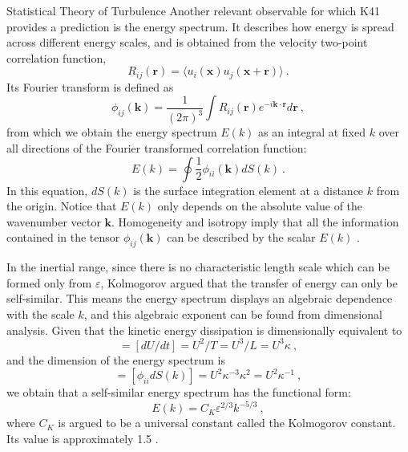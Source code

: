 \begin{chapter}{Statistical Theory of Turbulence}
Another relevant observable for which K41 provides a prediction
is the energy spectrum.
It describes how energy is spread across different energy scales,
and is obtained from the velocity two-point correlation function,
\begin{equation} \label{eq:vv-corr}
	R_{ij}(\mathbf{r}) = \langle u_i (\mathbf{x}) u_j(\mathbf{x}+\mathbf{r}) \rangle \ .
\end{equation}
Its Fourier transform is defined as
\begin{equation}
	\phi_{ij}(\mathbf{k}) = \frac{1}{(2 \pi)^3}
	\int R_{ij}(\mathbf{r}) e^{-i \mathbf{k} \cdot \mathbf{r}} d\mathbf{r} \ ,
\end{equation}
from which we obtain the energy spectrum $E(k)$ as an integral at fixed $k$
over all directions of the Fourier transformed correlation function:
\begin{equation}
	E(k) = \oint \frac12 \phi_{ii}(\mathbf{k}) dS(k) \ .
\end{equation}
In this equation, $dS(k)$ is the surface integration element at a distance $k$
from the origin.
Notice that $E(k)$ only depends on the absolute value of the wavenumber
vector $\mathbf{k}$. Homogeneity and isotropy imply that all the information
contained in the tensor $\phi_{ij}(\mathbf{k})$ can be described by the
scalar $E(k)$ \parencite{pope2000}.

In the inertial range, since there is no characteristic length scale which can
be formed only from $\varepsilon$, Kolmogorov argued that the transfer of energy can
only be self-similar. This means the energy spectrum displays an algebraic
dependence with the scale $k$,
and this algebraic exponent can be found from dimensional analysis.
Given that the kinetic energy dissipation is dimensionally equivalent to
\begin{equation}
	[ \varepsilon ] = [ dU/dt ] = U^2 /T = U^3 /L = U^3 \kappa \ ,
\end{equation}
and the dimension of the energy spectrum is
\begin{equation}
	[ E(k)] = [\phi_{ii} dS(k)] = U^2 \kappa^{-3} \kappa^2 = U^2 \kappa^{-1} \ ,
\end{equation}
we obtain that a self-similar energy spectrum has the functional form:
\begin{equation}
E(k) = C_K \varepsilon^{2/3} k^{-5/3} \ ,
\end{equation}
where $C_K$ is argued to be a universal constant called the Kolmogorov constant.
Its value is approximately 1.5 \parencite{sreenivasan1995universality}.


\end{chapter}
